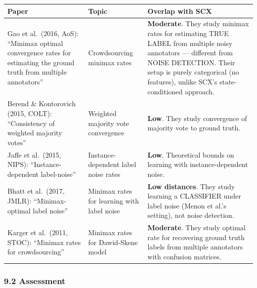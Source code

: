\documentclass[
  12pt,
]{ctexart}
\begin{document}
\begin{longtable}[]{@{}
  >{\raggedright\arraybackslash}p{}
  >{\raggedright\arraybackslash}p{}
  >{\raggedright\arraybackslash}p{}@{}}
\toprule\noalign{}
\begin{minipage}[b]{\linewidth}\raggedright
Paper
\end{minipage} & \begin{minipage}[b]{\linewidth}\raggedright
Topic
\end{minipage} & \begin{minipage}[b]{\linewidth}\raggedright
Overlap with SCX
\end{minipage} \\
\midrule\noalign{}
\endhead
\bottomrule\noalign{}
\endlastfoot
Gao et al.~(2016, AoS): ``Minimax optimal convergence rates for
estimating the ground truth from multiple annotators'' & Crowdsourcing
minimax rates & \textbf{Moderate}. They study minimax rates for
estimating TRUE LABEL from multiple noisy annotators --- different from
NOISE DETECTION. Their setup is purely categorical (no features), unlike
SCX's state-conditioned approach. \\
Berend \& Kontorovich (2015, COLT): ``Consistency of weighted majority
votes'' & Weighted majority vote convergence & \textbf{Low}. They study
convergence of majority vote to ground truth. \\
Jaffe et al.~(2015, NIPS): ``Instance-dependent label-noise'' &
Instance-dependent label noise rates & \textbf{Low}. Theoretical bounds
on learning with instance-dependent noise. \\
Bhatt et al.~(2017, JMLR): ``Minimax-optimal label noise'' & Minimax
rates for learning with label noise & \textbf{Low distances}. They study
learning a CLASSIFIER under label noise (Menon et al.'s setting), not
noise detection. \\
Karger et al.~(2011, STOC): ``Minimax rates for crowdsourcing'' &
Minimax rates for Dawid-Skene model & \textbf{Moderate}. They study
optimal rate for recovering ground truth labels from multiple annotators
with confusion matrices. \\
\end{longtable}

\subsubsection{9.2 Assessment}\label{assessment}
\end{document}
